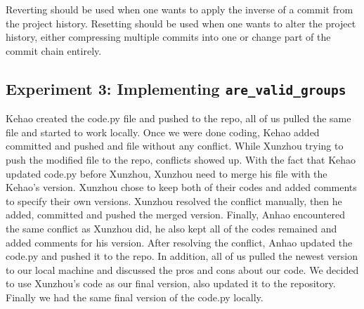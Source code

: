 \documentclass[titlepage, 12pt]{article}
\begin{document}
Reverting should be used when one wants to apply the inverse of a commit from
the project history. Resetting should be used when one wants to alter the
project history, either compressing multiple commits into one or change part of
the commit chain entirely.

\subsection{Experiment 3: Implementing \texttt{are\_valid\_groups}}

Kehao created the code.py file and pushed to the repo, all of us pulled the same
file and started to work locally. Once we were done coding, Kehao added
committed and pushed and file without any conflict. While Xunzhou trying to push
the modified file to the repo, conflicts showed up. With the fact that Kehao
updated code.py before Xunzhou, Xunzhou need to merge his file with the Kehao's
version. Xunzhou chose to keep both of their codes and added comments to specify
their own versions. Xunzhou resolved the conflict manually, then he added,
committed and pushed the merged version. Finally, Anhao encountered the same
conflict as Xunzhou did, he also kept all of the codes remained and added
comments for his version. After resolving the conflict, Anhao updated the
code.py and pushed it to the repo. In addition, all of us pulled the newest
version to our local machine and discussed the pros and cons about our code. We
decided to use Xunzhou's code as our final version, also updated it to the
repository. Finally we had the same final version of the code.py locally.

\newpage{}
\end{document}
